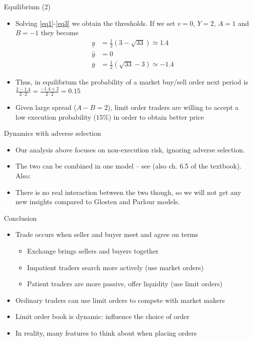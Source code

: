 \documentclass[english,10pt
,aspectratio=169
]{beamer}
\begin{document}
\begin{frame}{Equilibrium (2)}
	\begin{itemize}
		\item Solving \eqref{eq1}-\eqref{eq3} we obtain the thresholds. If we set $v=0$, $Y=2$, $A=1$ and $B=-1$ they become
		\begin{align*}
		\underline{y} 	& = \frac{1}{2}(3-\sqrt{33}) \simeq 1.4 \\
		\hat{y} 	& = 0 \\
		\overline{y} 		& = \frac{1}{2}(\sqrt{33}-3) \simeq -1.4 
		\end{align*}
		\item Thus, in equilibrium the probability of a market buy/sell order next period is $\frac{2-1.4}{2\cdot 2}=\frac{-1.4+2}{2 \cdot 2}=0.15$
		\item Given  large spread ($A-B=2$), limit order traders are willing to accept a low execution probability ($15\%$) in order to obtain better price
	\end{itemize}
\end{frame}


\begin{frame}{Dynamics with adverse selection}
	\begin{itemize}
		\item Our analysis above focuses on non-execution risk, ignoring adverse selection.
		\item The two can be combined in one model -- see \cite{foucault_order_1999} (also ch. 6.5 of the textbook). Also: \hyperlink{adverse}{}
		\item There is no real interaction between the two though, so we will not get any new insights compared to Glosten and Parlour models.
	\end{itemize}
\end{frame}


\begin{frame}[label=parlourmain]{Conclusion}
	\begin{itemize}
		\item Trade occurs when seller and buyer meet and agree on terms
		\begin{itemize}
			\item Exchange brings sellers and buyers together
			\item Impatient traders search more actively (use market orders)
			\item Patient traders are more passive, offer liquidity (use limit orders)
		\end{itemize}
		\item Ordinary traders can use limit orders to compete with market makers
		\item Limit order book is dynamic: influence the choice of order
		\item In reality, many features to think about when placing orders
	\end{itemize}
\end{frame}
\end{document}
